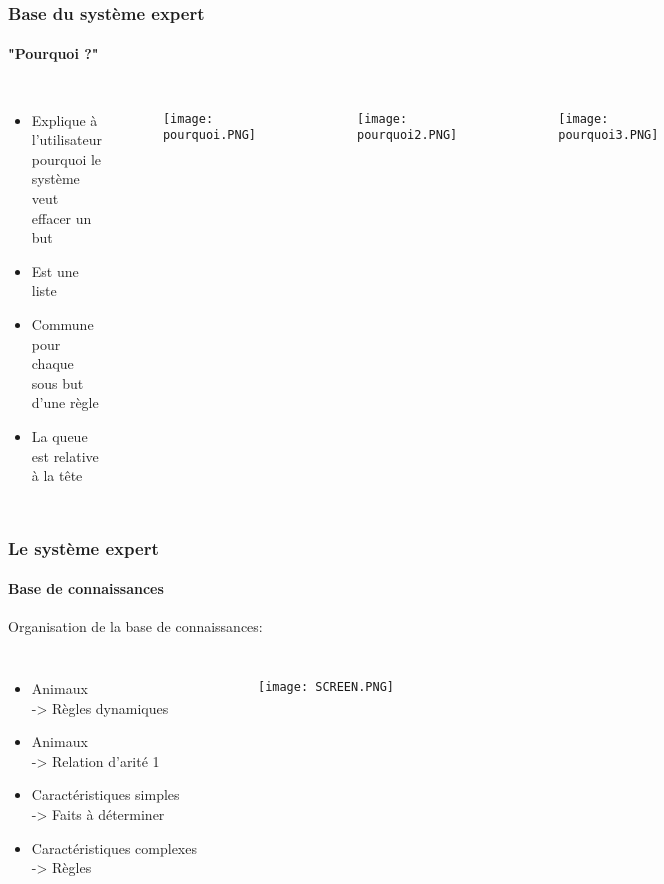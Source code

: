 \documentclass[10pt]{beamer}
\begin{document}
\begin{frame}
	\frametitle{\textbf {\Large Base du système expert}}
	\framesubtitle{\large "Pourquoi ?"}
	
	\begin{columns}
			\begin{itemize}
				\item Explique à l'utilisateur pourquoi le système veut effacer un but
				\smallskip
				\item Est une liste
				\smallskip
				\item Commune pour chaque sous but d'une règle
				\smallskip
				\item La queue est relative à la tête
			\end{itemize}
			
			\begin{figure}
				\texttt{[image: pourquoi.PNG]}
 				\label{pic: Base de connaissance}
 			\end{figure}
 			\begin{figure}
				\texttt{[image: pourquoi2.PNG]}
 				\label{pic: Base de connaissance}
 			\end{figure}
 			\begin{figure}
				\texttt{[image: pourquoi3.PNG]}
 				\label{pic: Base de connaissance}
 			\end{figure}
	\end{columns}

\end{frame}



\begin{frame}
	\frametitle{\textbf {\Large Le système expert}}
	\framesubtitle{\large Base de connaissances}
	\large Organisation de la base de connaissances:
	\bigskip
	\begin{columns}
	
		\column{0.4\textwidth}
		\small
			\begin{itemize}
				\item Animaux \\-> Règles dynamiques
					\smallskip
				\item Animaux \\-> Relation d'arité 1	
				\smallskip
				\item Caractéristiques simples \\-> Faits à déterminer
				\smallskip
				\item Caractéristiques complexes \\-> Règles %
			\end{itemize}
			
		\column{0.65\textwidth}
			\begin{figure}
				\texttt{[image: SCREEN.PNG]}
 				\label{pic: Base de connaissance}
 			\end{figure}
	\end{columns}

\end{frame}
\end{document}
